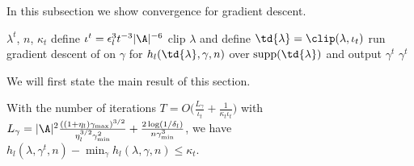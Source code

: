 \documentclass{article}
\newcommand{\lalit}[1]{\textcolor{blue}{}}
\newcommand{\1}{\mathbf{1}}
\newcommand{\supp}{\operatorname{supp}}
\begin{document}
In this subsection we show convergence for gradient descent. 

\begin{algorithm}[!htb]
\caption{\textsf{GD}}
\begin{algorithmic}[1]\label{alg:gd}
\REQUIRE $\lambda^t$, $n$, $\kappa_t$
\STATE define $\iota^t=\epsilon_l^3t^{-3}|\A|^{-6}$
\STATE clip $\lambda$ and define $\td{\lambda}=\clip(\lambda,\iota_t)$
\STATE run gradient descent of on $\gamma$ for $h_l(\td{\lambda},\gamma,n)$ over $\supp(\td{\lambda})$ and output $\gamma^t$
\ENSURE $\gamma^t$
\end{algorithmic}
\end{algorithm}
\lalit{Make the steps be on the superscript. Define}

We will first state the main result of this section. 

\begin{lemma}\label{lem:gd_conv}
With the number of iterations $T=O\big(\frac{L_\gamma}{\iota_t}+\frac{1}{\kappa_t\iota_t}\big)$ with $L_\gamma=|\A|^2\frac{((1+\eta_l)\gamma_{\max})^{3/2}}{\eta_l^{3/2}\gamma_{\min}^2}+\frac{2\log(1/\delta_l)}{n\gamma_{\min}^3}$, we have $h_l(\lambda,\gamma^{t},n)-\min_{\gamma}h_l(\lambda,\gamma,n)\leq \kappa_t$. 
\end{lemma}
\end{document}

